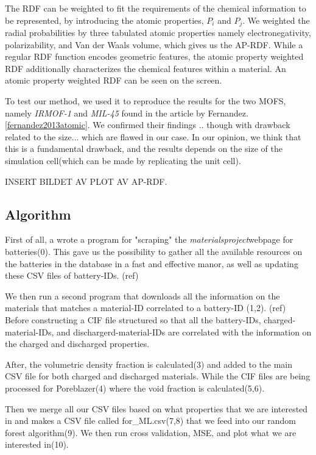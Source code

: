 The RDF can be weighted to fit the requirements of the chemical information to be represented, by introducing the atomic properties, $P_i$ and $P_j$. We weighted the radial probabilities by three tabulated atomic properties namely electronegativity, polarizability, and Van der Waals volume, which gives us the AP-RDF. While a regular RDF function encodes geometric features, the atomic property weighted RDF additionally characterizes the chemical features within a material. An atomic property weighted RDF can be seen on the screen. 

To test our method, we used it to reproduce the results for the two MOFS, namely \textit{IRMOF-1} and \textit{MIL-45} found in the article by Fernandez.\ref{fernandez2013atomic}. We confirmed their findings .. though with drawback related to the size... which are flawed in our case.  In our opinion, we think that this is a fundamental drawback, and the results depends on the size of the simulation cell(which can be made by replicating the unit cell). 

INSERT BILDET AV PLOT AV AP-RDF. 

\subsection{Algorithm}

First of all, a wrote a program for "scraping" the \textit{materialsproject}webpage for batteries(0). This gave us the possibility to gather all the available resources on the batteries in the database in a fast and effective manor, as well as updating these CSV files of  battery-IDs. (ref)

We then run a second program that downloads all the information on the materials that matches a material-ID correlated to a battery-ID (1,2). (ref) Before constructing a CIF file structured so that all the battery-IDs, charged-material-IDs, and dischargerd-material-IDs are correlated with the information on the charged and discharged properties. 

After, the volumetric density fraction is calculated(3) and added to the main CSV file for both charged and discharged materials. While the CIF files are being processed for Poreblazer(4) where the void fraction is calculated(5,6). 

Then we merge all our CSV files based on what properties that we are interested in and makes a CSV file called for\_ML.csv(7,8) that we feed into our random forest algorithm(9). We then run cross validation, MSE, and plot what we are interested in(10).

